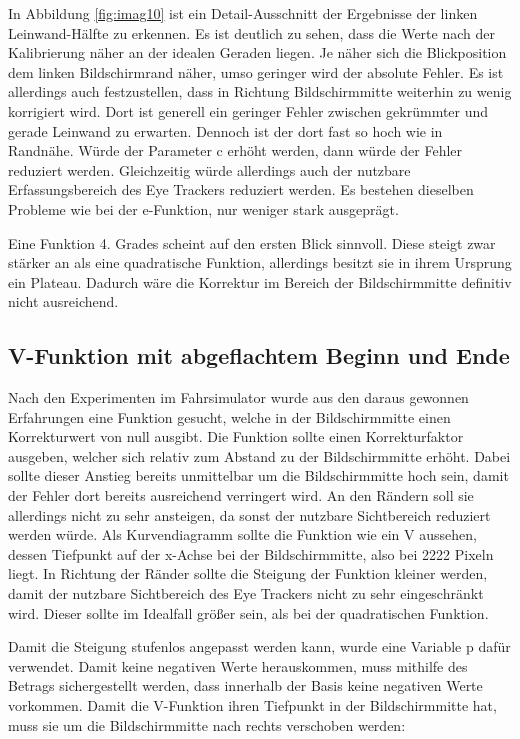 In Abbildung \ref{fig:imag10} ist ein Detail-Ausschnitt der Ergebnisse der linken Leinwand-Hälfte zu erkennen. Es ist deutlich zu sehen, dass die Werte nach der Kalibrierung näher an der idealen Geraden liegen. Je näher sich die Blickposition dem linken Bildschirmrand näher, umso geringer wird der absolute Fehler. Es ist allerdings auch festzustellen, dass in Richtung Bildschirmmitte weiterhin zu wenig korrigiert wird. Dort ist generell ein geringer Fehler zwischen gekrümmter und gerade Leinwand zu erwarten. Dennoch ist der dort fast so hoch wie in Randnähe. Würde der Parameter c erhöht werden, dann würde der Fehler reduziert werden. Gleichzeitig würde allerdings auch der nutzbare Erfassungsbereich des Eye Trackers reduziert werden. Es bestehen dieselben Probleme wie bei der e-Funktion, nur weniger stark ausgeprägt. 

Eine Funktion 4. Grades scheint auf den ersten Blick sinnvoll. Diese steigt zwar stärker an als eine quadratische Funktion, allerdings besitzt sie in ihrem Ursprung ein Plateau. Dadurch wäre die Korrektur im Bereich der Bildschirmmitte definitiv nicht ausreichend. 


\subsection{V-Funktion mit abgeflachtem Beginn und Ende}

Nach den Experimenten im Fahrsimulator wurde aus den daraus gewonnen Erfahrungen eine Funktion gesucht, welche in der Bildschirmmitte einen Korrekturwert von null ausgibt. Die Funktion sollte einen Korrekturfaktor ausgeben, welcher sich relativ zum Abstand zu der Bildschirmmitte erhöht. Dabei sollte dieser Anstieg bereits unmittelbar um die Bildschirmmitte hoch sein, damit der Fehler dort bereits ausreichend verringert wird. An den Rändern soll sie allerdings nicht zu sehr ansteigen, da sonst der nutzbare Sichtbereich reduziert werden würde. Als Kurvendiagramm sollte die Funktion wie ein V aussehen, dessen Tiefpunkt auf der x-Achse bei der Bildschirmmitte, also bei 2222 Pixeln liegt. In Richtung der Ränder sollte die Steigung der Funktion kleiner werden, damit der nutzbare Sichtbereich des Eye Trackers nicht zu sehr eingeschränkt wird. Dieser sollte im Idealfall größer sein, als bei der quadratischen Funktion. 

Damit die Steigung stufenlos angepasst werden kann, wurde eine Variable p dafür verwendet. Damit keine negativen Werte herauskommen, muss mithilfe des Betrags sichergestellt werden, dass innerhalb der Basis keine negativen Werte vorkommen. Damit die V-Funktion ihren Tiefpunkt in der Bildschirmmitte hat, muss sie um die Bildschirmmitte nach rechts verschoben werden:

